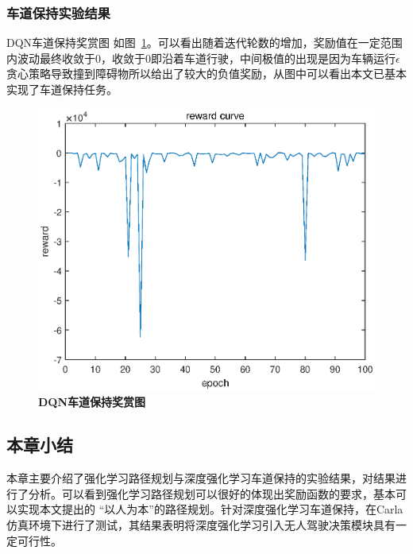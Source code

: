 \subsubsection{车道保持实验结果}
DQN车道保持奖赏图
如图~\ref{fig:4-5}。可以看出随着迭代轮数的增加，奖励值在一定范围内波动最终收敛于0，收敛于0即沿着车道行驶，中间极值的出现是因为车辆运行$\epsilon$贪心策略导致撞到障碍物所以给出了较大的负值奖励，从图中可以看出本文已基本实现了车道保持任务。
\begin{figure}[H]
  \centering
  \includegraphics[width=0.5\linewidth]{fig/reward.eps}
  \caption{\textbf{DQN车道保持奖赏图}}
  \label{fig:4-5}
\end{figure}

\subsection{本章小结}
本章主要介绍了强化学习路径规划与深度强化学习车道保持的实验结果，对结果进行了分析。可以看到强化学习路径规划可以很好的体现出奖励函数的要求，基本可以实现本文提出的
“以人为本”的路径规划。针对深度强化学习车道保持，在Carla仿真环境下进行了测试，其结果表明将深度强化学习引入无人驾驶决策模块具有一定可行性。